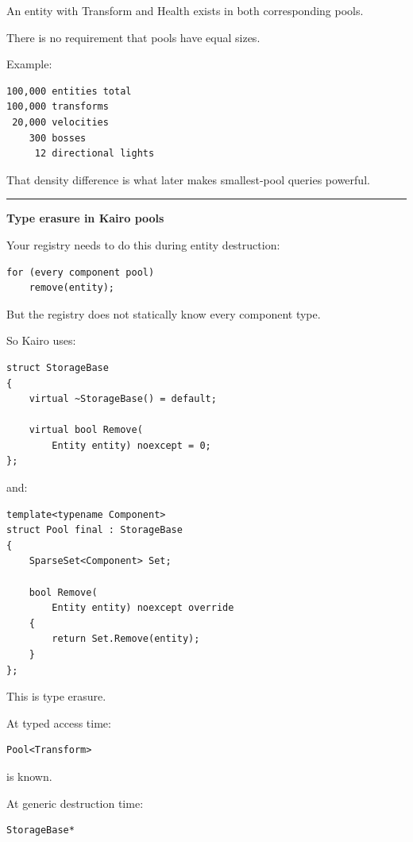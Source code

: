 An entity with Transform and Health exists in both corresponding pools.

There is no requirement that pools have equal sizes.

Example:

\begin{verbatim}
100,000 entities total
100,000 transforms
 20,000 velocities
    300 bosses
     12 directional lights
\end{verbatim}

That density difference is what later makes smallest-pool queries powerful.

\begin{center}\rule{0.5\linewidth}{0.5pt}\end{center}

\textbf{Type erasure in Kairo pools}

Your registry needs to do this during entity destruction:

\begin{verbatim}
for (every component pool)
    remove(entity);
\end{verbatim}

But the registry does not statically know every component type.

So Kairo uses:

\begin{verbatim}
struct StorageBase
{
    virtual ~StorageBase() = default;

    virtual bool Remove(
        Entity entity) noexcept = 0;
};
\end{verbatim}

and:

\begin{verbatim}
template<typename Component>
struct Pool final : StorageBase
{
    SparseSet<Component> Set;

    bool Remove(
        Entity entity) noexcept override
    {
        return Set.Remove(entity);
    }
};
\end{verbatim}

This is type erasure.

At typed access time:

\begin{verbatim}
Pool<Transform>
\end{verbatim}

is known.

At generic destruction time:

\begin{verbatim}
StorageBase*
\end{verbatim}

